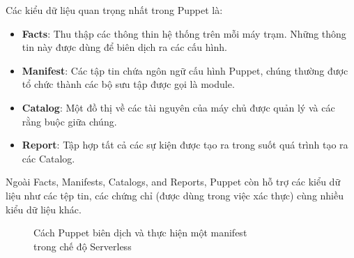 \newpage
\clearpage
Các kiểu dữ liệu quan trọng nhất trong Puppet là:

\begin{itemize}
\item \textbf{Facts}: Thu thập các thông thin hệ thống trên mỗi máy trạm. Những thông tin này được dùng để biên dịch ra các cấu hình.

\item \textbf{Manifest}: Các tập tin chứa ngôn ngữ cấu hình Puppet, chúng thường được tổ chức thành các bộ sưu tập được gọi là module.

\item \textbf{Catalog}: Một đồ thị về các tài nguyên của máy chủ được quản lý và các rằng buộc giữa chúng.

\item \textbf{Report}: Tập hợp tất cả các sự kiện được tạo ra trong suốt quá trình tạo ra các Catalog.
\end{itemize}

Ngoài Facts, Manifests, Catalogs, and Reports, Puppet còn hỗ trợ các kiểu dữ liệu như các tệp tin, các chứng chỉ (được dùng trong việc xác thực) cùng nhiều kiểu dữ liệu khác.

\begin{figure}[h!]
    \begin{center}
    \end{center}
    \caption{Cách Puppet biên dịch và thực hiện một manifest\\ trong chế độ Serverless}
    \label{fig:puppet_manifest_to_defined_state_unified}
\end{figure}

